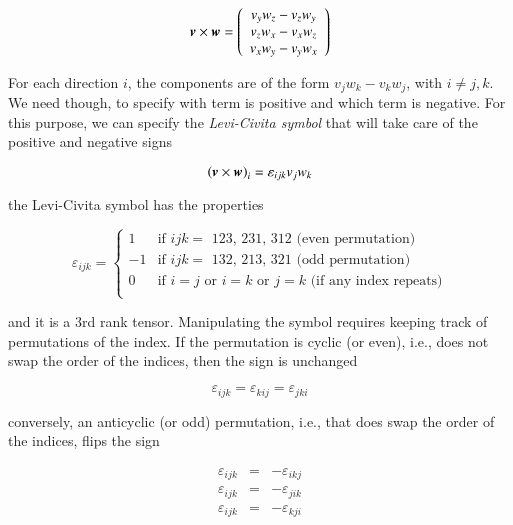 \begin{equation}
{\boldsymbol{v}} \times {\boldsymbol{w}} = \left(\begin{array}{c}v_yw_z-v_zw_y\\ v_zw_x-v_xw_z\\ v_xw_y-v_yw_x\end{array} \right)
\end{equation}

For each direction $i$, the components are of the form
$v_jw_k-v_kw_j$, with $i\neq j,k$. We need though, to specify with
term is positive and which term is negative. For this purpose, we can
specify the {\it Levi-Civita symbol} that will take care of the positive and negative signs 


\begin{equation}
\left({\boldsymbol{v}} \times {\boldsymbol{w}}\right)_i = \varepsilon_{ijk} v_j w_k
\end{equation}

\noindent the Levi-Civita symbol has the properties 

\begin{equation}
\varepsilon_{ijk}  = \left\{\begin{array}{cl}
1&\mbox{if $ijk=$ 123, 231, 312 (even permutation)}\\
-1&\mbox{if $ijk=$  132, 213, 321 (odd permutation)} \\
0&\mbox{if $i=j$ or $i=k$ or $j=k$ (if any index repeats)} \\
\end{array}
\right.
\end{equation}


\noindent and it is a 3rd rank tensor. Manipulating the symbol requires keeping track of permutations of the index. If the permutation is cyclic (or even), i.e., does not swap the order of the indices, then the sign is unchanged

\begin{equation}
\varepsilon_{ijk} = \varepsilon_{kij} = \varepsilon_{jki}  
\end{equation}

\noindent conversely, an anticyclic (or odd) permutation, i.e., that does swap the order of the indices, flips the sign 

\begin{eqnarray}
\varepsilon_{ijk} &=& -\varepsilon_{ikj} \\
\varepsilon_{ijk} &=& -\varepsilon_{jik} \\
\varepsilon_{ijk} &=& -\varepsilon_{kji} 
\end{eqnarray}

